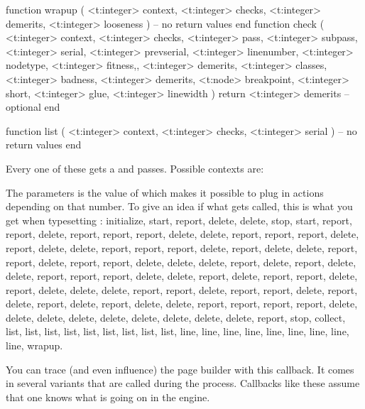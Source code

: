 \starttyping[option=LUA]
function wrapup (
    <t:integer> context,
    <t:integer> checks,
    <t:integer> demerits,
    <t:integer> looseness
)
    -- no return values
end
\stoptyping
\starttyping[option=LUA]
function check (
    <t:integer> context,
    <t:integer> checks,
    <t:integer> pass,
    <t:integer> subpass,
    <t:integer> serial,
    <t:integer> prevserial,
    <t:integer> linenumber,
    <t:integer> nodetype,
    <t:integer> fitness,,
    <t:integer> demerits,
    <t:integer> classes,
    <t:integer> badness,
    <t:integer> demerits,
    <t:node>    breakpoint,
    <t:integer> short,
    <t:integer> glue,
    <t:integer> linewidth
)
    return <t:integer> demerits  -- optional
end
\stoptyping

\starttyping[option=LUA]
function list (
    <t:integer> context,
    <t:integer> checks,
    <t:integer> serial
)
    -- no return values
end
\stoptyping

Every one of these gets a  and  passes. Possible
contexts are:

\startfourrows
{}
\stopfourrows

The  parameters is the value of \type {\linebreakchecks} which
makes it possible to plug in actions depending on that number. To give an idea if
what gets called, this is what you get when typesetting :
initialize, start, report, delete, delete, stop, start, report, report, delete,
report, report, report, delete, delete, report, report, report, delete, report,
delete, delete, report, report, report, delete, report, delete, delete, report,
report, delete, report, report, delete, delete, delete, report, delete, report,
delete, delete, report, report, report, delete, delete, report, delete, report,
report, delete, report, delete, delete, delete, report, report, delete, report,
report, delete, report, delete, report, delete, report, delete, delete, report,
report, report, report, delete, delete, delete, delete, delete, delete, delete,
delete, delete, report, stop, collect, list, list, list, list, list, list, list,
list, list, line, line, line, line, line, line, line, line, line, wrapup.

\stopsubsection

\startsubsection[title=show_build]

You can trace (and even influence) the page builder with this callback. It comes in
several variants that are called during the process. Callbacks like these assume that
one knows what is going on in the engine.

